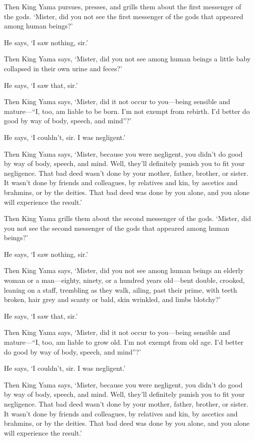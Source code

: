 \documentclass[12pt,openany]{book}%
\begin{document}
Then King Yama pursues, presses, and grills them about the first messenger of the gods. ‘Mister, did you not see the first messenger of the gods that appeared among human beings?’ 

He says, ‘I saw nothing, sir.’ 

Then King Yama says, ‘Mister, did you not see among human beings a little baby collapsed in their own urine and feces?’ 

He says, ‘I saw that, sir.’ 

Then King Yama says, ‘Mister, did it not occur to you—being sensible and mature—“I, too, am liable to be born. I’m not exempt from rebirth. I’d better do good by way of body, speech, and mind”?’ 

He says, ‘I couldn’t, sir. I was negligent.’ 

Then King Yama says, ‘Mister, because you were negligent, you didn’t do good by way of body, speech, and mind. Well, they’ll definitely punish you to fit your negligence. That bad deed wasn’t done by your mother, father, brother, or sister. It wasn’t done by friends and colleagues, by relatives and kin, by ascetics and brahmins, or by the deities. That bad deed was done by you alone, and you alone will experience the result.’ 

Then King Yama grills them about the second messenger of the gods. ‘Mister, did you not see the second messenger of the gods that appeared among human beings?’ 

He says, ‘I saw nothing, sir.’ 

Then King Yama says, ‘Mister, did you not see among human beings an elderly woman or a man—eighty, ninety, or a hundred years old—bent double, crooked, leaning on a staff, trembling as they walk, ailing, past their prime, with teeth broken, hair grey and scanty or bald, skin wrinkled, and limbs blotchy?’ 

He says, ‘I saw that, sir.’ 

Then King Yama says, ‘Mister, did it not occur to you—being sensible and mature—“I, too, am liable to grow old. I’m not exempt from old age. I’d better do good by way of body, speech, and mind”?’ 

He says, ‘I couldn’t, sir. I was negligent.’ 

Then King Yama says, ‘Mister, because you were negligent, you didn’t do good by way of body, speech, and mind. Well, they’ll definitely punish you to fit your negligence. That bad deed wasn’t done by your mother, father, brother, or sister. It wasn’t done by friends and colleagues, by relatives and kin, by ascetics and brahmins, or by the deities. That bad deed was done by you alone, and you alone will experience the result.’ 
\end{document}
